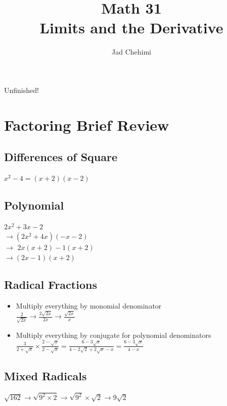 \documentclass[a4paper,12pt]{article}
\title{Math 31 \\ Limits and the Derivative}
\author{Jad Chehimi}
\begin{document}
\maketitle

\begin{center}
\Huge
Unfinished!
\normalsize
\end{center}

\tableofcontents

\pagebreak

\section{Factoring Brief Review}
\subsection{Differences of Square}
\Large
$x^2 - 4 = (x + 2)(x - 2)$
\normalsize

\subsection{Polynomial}
\Large
$2x^2 + 3x - 2$ \\
$\longrightarrow (2x^2 + 4x)(-x - 2)$ \\
$\longrightarrow \,\,2x(x+2) - 1(x+2)$ \\
$\longrightarrow (2x - 1)(x + 2)$
\normalsize

\subsection{Radical Fractions}
\begin{itemize}
    \item{
            Multiply everything by monomial denominator\\
            \Large
            $\frac{2}{\sqrt{2x}} \longrightarrow \frac{2\sqrt{2x}}{2x} \longrightarrow \frac{\sqrt{2x}}{x}$
            \normalsize
        }
    \item{
            Multiply everything by conjugate for polynomial denominators\\
            \Large
            $\frac{3}{2+\sqrt{x}} \times \frac{2-\sqrt{x}}{2-\sqrt{x}} = \frac{6-3\sqrt{x}}{4-2\sqrt{2} + 2\sqrt{x} - x} = \frac{6-3\sqrt{x}}{4-x}$
            \normalsize
        }
\end{itemize}

\subsection{Mixed Radicals}
\Large
$\sqrt{162} \longrightarrow \sqrt{9^2 \times 2} \longrightarrow \sqrt{9^2} \times \sqrt{2} \longrightarrow 9\sqrt{2}$
\normalsize
\end{document}
